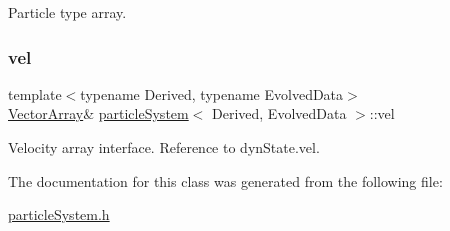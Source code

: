 Particle type array. 

\mbox{\label{classparticle_system_a545da170c4d59f18c6ddb18817cb5f3e}} 
\subsubsection{\texorpdfstring{vel}{vel}}
{\footnotesize\ttfamily template$<$typename Derived, typename Evolved\+Data$>$ \\
\mbox{\hyperlink{classparticle_system_a6f66ed187a286c0d42ab2f83b8b6193b}{Vector\+Array}}\& \mbox{\hyperlink{classparticle_system}{particle\+System}}$<$ Derived, Evolved\+Data $>$\+::vel}



Velocity array interface. Reference to dyn\+State.\+vel. 



The documentation for this class was generated from the following file\+:\begin{DoxyCompactItemize}
\item 
\mbox{\hyperlink{particle_system_8h}{particle\+System.\+h}}\end{DoxyCompactItemize}
